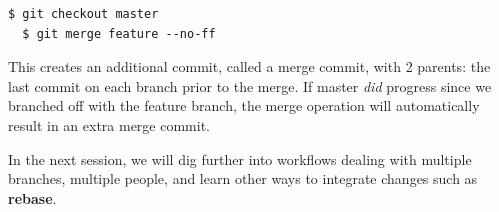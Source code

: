 \documentclass{tufte-handout}
\begin{document}
\begin{lstlisting}[style=BashInputStyle]
  $ git checkout master
  $ git merge feature --no-ff
\end{lstlisting}

This creates an additional commit, called a merge commit, with 2 parents: the last commit on each branch prior to the merge.
If master \textit{did} progress since we branched off with the feature branch, the merge operation will automatically result in an extra merge commit.

In the next session, we will dig further into workflows dealing with multiple branches, multiple people, and learn other ways to integrate changes such as \textbf{rebase}.



\end{document}
